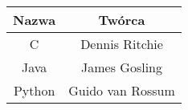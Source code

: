 \begin{table}[htbp]
\centering
\begin{tabular}{|c | c|}

\hline
Nazwa & Twórca\\
\hline
C & Dennis Ritchie \\
Java & James Gosling\\
Python & Guido van Rossum\\
\hline
\end{tabular}
\end{table}
